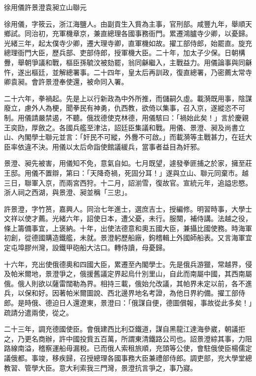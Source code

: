 
\begin{pinyinscope}
徐用儀許景澄袁昶立山聯元

徐用儀，字筱云，浙江海鹽人。由副貢生入貲為主事，官刑部。咸豐九年，舉順天鄉試。同治初，充軍機章京，兼直總理各國事務衙門。累遷鴻臚寺少卿，以憂歸。光緒三年，起太僕寺少卿，遷大理寺卿，直軍機如故。擢工部侍郎，始罷直。旋充總理衙門大臣，歷兵部、吏部侍郎，授軍機大臣。二十年，加太子少保。日朝構釁，舉朝爭議和戰，樞臣孫毓汶被劾罷，翁同龢繼入，主戰益力。用儀論事與同龢忤，遂出樞廷，並解總署事。二十四年，皇太后再訓政，復直總署，乃密薦太常寺卿袁昶。會許景澄奉使還，被命同入署。

二十六年，拳禍起。先是上以行新政為中外所推，而儲嗣久虛。載漪既用事，陰謀廢立，慮外人為梗，聞拳民有神勇，仇西教，欲倚以集事，召入京，遂縱恣不可制。用儀請嚴禁遏，不聽。俄戕德使克林德，用儀駭曰：「禍始此矣！」言於慶親王奕劻，厚斂之。各國兵艦至津沽，詔廷臣集議和戰。用儀、景澄、昶及尚書立山、內閣學士聯元並言：「奸民不可縱，外釁不可啟。」而載漪等主戰甚力，在廷大臣率依違不決。用儀以太后命詣使館議緩兵，當事者益目為奸邪。

景澄、昶先被害，用儀知不免，意氣自如。七月既望，遽發拳匪捕之於家，擁至莊王邸。用儀不置辯，第曰：「天降奇禍，死固分耳！」遂與立山、聯元同棄市。越三日，聯軍入京，而兩宮西狩。十二月，詔湔雪，復故官。宣統元年，追謚忠愍。浙人祠之西湖，與景澄、昶並稱「三忠」。

許景澄，字竹筼，嘉興人。同治七年進士，選庶吉士，授編修。明習時事，大學士文祥以使才薦。光緒六年，詔使日本，遭父憂，未行。服闋，補侍講。法越之役，條上籌備事宜，上褒納。十年，出使法德意和奧五國大臣，兼攝比國使務。時海軍初創，從德國購造鐵艦，未就。景澄躬歷船廠，鉤稽輯上外國師船表。又言海軍宜定屯埠膠州灣，設鐵甲砲船大沽口。轉侍讀，母憂歸。

十六年，充出使俄德奧和四國大臣，累遷至內閣學士。先是俄兵游獵，常越界，侵及帕米爾地，景澄爭之，俄援舊議定界起烏什別里山，自此而南屬中國，其西南屬俄。俄人則欲以薩雷闊勒為界。相持三載，俄始允改議，其帕界未定以前，各不進兵，以保和好。因著帕米爾圖說、西北邊界地名考證，為他日界約備。擢工部侍郎。是時俄、德迫日人還遼東，景澄曰：「俄謀自便，德圖償報，事故從此多矣！」疏請分遣兩使，從之。

二十三年，調充德國使臣。會俄建西比利亞鐵道，謀自黑龍江達海參崴，朝議拒之，乃更名商辦，許中國投貲五百萬，所謂東清鐵路公司也。詔景澄綜其事，力阻路線南溢，稽察運船毋漏稅。已而俄人索租旅順，充頭等公使，會駐俄使臣楊儒定議俄都。事竣，移疾歸，召授總理各國事務大臣兼禮部侍郎。調吏部，充大學堂總教習、管學大臣。意大利索我三門灣，景澄抗言爭之，事乃寢。


\end{pinyinscope}
